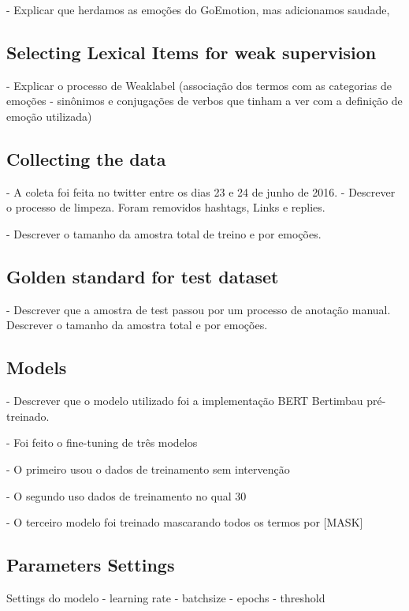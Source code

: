 \documentclass[12pt]{article}
\begin{document}
- Explicar que herdamos as emoções do GoEmotion, mas adicionamos saudade,


\subsection{Selecting Lexical Items for weak supervision }
- Explicar o processo de Weaklabel (associação dos termos com as categorias de emoções - sinônimos e conjugações de verbos que tinham a ver com a definição de emoção utilizada)

\subsection{Collecting the data}

- A coleta foi feita no twitter entre os dias 23 e 24 de junho de 2016.
- Descrever o processo de limpeza. Foram removidos hashtags, Links e replies.

- Descrever o tamanho da amostra total de treino e por emoções.

\subsection{Golden standard for test dataset}

- Descrever que a amostra de test passou por um processo de anotação manual. Descrever o tamanho da amostra total e por emoções.



\subsection{Models}
- Descrever que o modelo utilizado foi a implementação BERT Bertimbau pré-treinado.

- Foi feito o fine-tuning de três modelos

- O primeiro usou o dados de treinamento sem intervenção

- O segundo uso dados de treinamento no qual 30%

- O terceiro modelo foi treinado mascarando todos os termos por [MASK]

\subsection{Parameters Settings}
Settings do modelo
- learning rate
- batchsize
- epochs
- threshold
\end{document}
